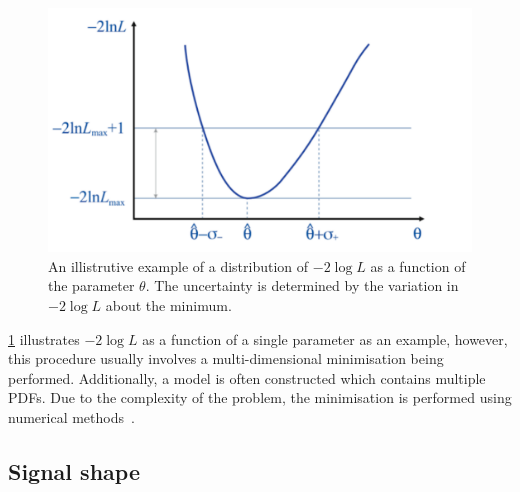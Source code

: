\begin{figure}
\centering
\includegraphics[width=0.7\linewidth]{figures/fitComponents/likelihood.pdf}
\caption{An illistrutive example of a distribution of $-2\log L$ as a function of the parameter $\theta$. The uncertainty is determined by the variation in $-2\log L$ about the minimum.}
\label{fig:likelihood}
\end{figure}

\Fig\ref{fig:likelihood} illustrates $-2\log L$ as a function of a single parameter as an example, however, this procedure usually involves a multi-dimensional minimisation being performed. Additionally, a model is often constructed which contains multiple PDFs. Due to the complexity of the problem, the minimisation is performed using numerical methods~\cite{minuit}.


\subsection{Signal shape}
\label{sec:massfit:signal}

